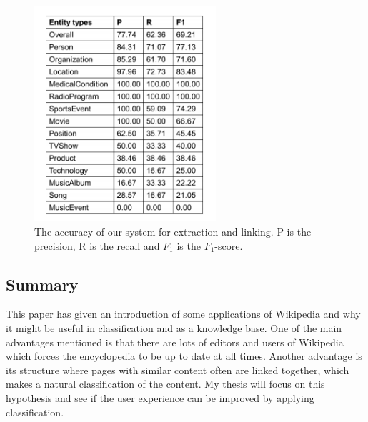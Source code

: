 \documentclass[11pt,english,a4paper]{article}
\begin{document}


\begin{figure}
\centering
\includegraphics[height=8cm]{Classification_entities}
\caption{The accuracy of our system for extraction and linking. P is the precision, R is the recall and $F_{1}$ is the $F_{1}$-score.} %
\label{fig:classification_entities}
\end{figure}


\subsection*{Summary}
This paper has given an introduction of some applications of Wikipedia and why it might be useful in classification and as a knowledge base. One of the main advantages mentioned is that there are lots of editors and users of Wikipedia which forces the encyclopedia to be up to date at all times. Another advantage is its structure where pages with similar content often are linked together, which makes a natural classification of the content. My thesis will focus on this hypothesis and see if the user experience can be improved by applying classification.

\end{document}
